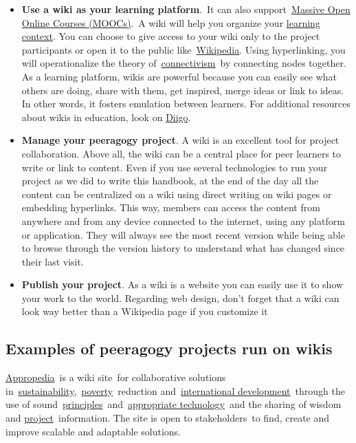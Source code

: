 \begin{itemize}
\itemsep1pt\parskip0pt
\item
  \textbf{Use a wiki as your learning platform}.~It can also
  support~\href{http://socialmediaclassroom.com/host/peeragogy/wiki/connectivism-practice-how-organize-a-mooc}{Massive
  Open Online Courses (MOOCs)}.~A wiki will help you organize your
  \href{http://socialmediaclassroom.com/host/peeragogy/wiki/organizing-a-learning-context}{learning
  context}. You can choose to give access to your wiki only to the
  project participants or open it to the public
  like~\href{http://www.wikipedia.org/}{Wikipedia}. Using hyperlinking,
  you will operationalize the theory
  of~\href{http://en.wikipedia.org/wiki/Connectivism}{connectivism}~by
  connecting nodes together. As a learning platform, wikis are powerful
  because you can easily see what others are doing, share with them, get
  inspired, merge ideas or link to ideas. In other words, it fosters
  emulation between learners. For additional resources about wikis in
  education, look on
  \href{http://www.diigo.com/user/regisb/wiki\%20education}{Diigo}.
\item
  \textbf{Manage your peeragogy project}. A wiki is an excellent tool
  for project collaboration. Above all, the wiki can be a central place
  for peer learners to write or link to content. Even if you use several
  technologies to run your project as we did to write this handbook, at
  the end of the day all the content can be centralized on a wiki using
  direct writing on wiki pages or embedding hyperlinks. This way,
  members can access the content from anywhere and from any device
  connected to the internet, using any platform or application. They
  will always see the most recent version while being able to browse
  through the version history to understand what has changed since their
  last visit.
\item
  \textbf{Publish your project}. As a wiki is a website you can easily
  use it to show your work to the world. Regarding web design, don't
  forget that a wiki can look way better than a Wikipedia page if you
  customize it
\end{itemize}

\subsection{Examples of peeragogy projects run on
wikis}\label{examples-of-peeragogy-projects-run-on-wikis}

\href{http://www.appropedia.org/Welcome_to_Appropedia}{Appropedia}~is a
wiki site~for collaborative solutions
in~\href{http://www.appropedia.org/Sustainability}{sustainability},~\href{http://www.appropedia.org/Poverty}{poverty}~reduction
and~\href{http://www.appropedia.org/International_development}{international
development}~through the use of
sound~\href{http://www.appropedia.org/Principles}{principles}~and~\href{http://www.appropedia.org/Appropriate_technology}{appropriate
technology}~and the sharing of wisdom and
\href{http://www.appropedia.org/Project}{project}~information. The site
is open to stakeholders~to find, create and improve scalable and
adaptable solutions.

